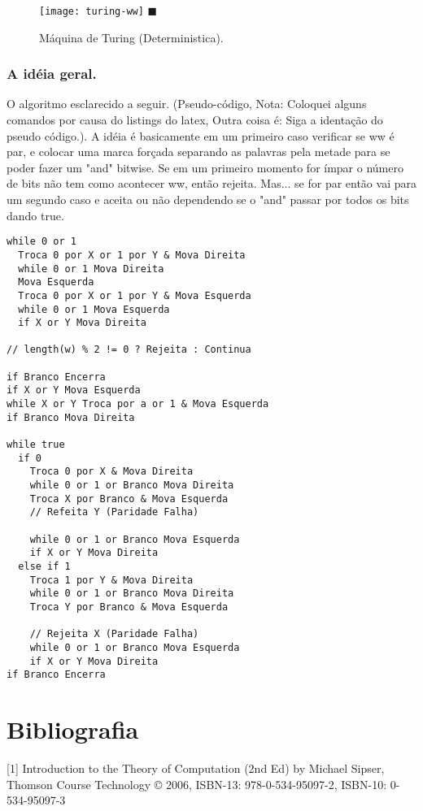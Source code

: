 \documentclass[12pt, a4paper]{article}
\begin{document}
\begin{figure}[ht]
\centering
\texttt{[image: turing-ww]} \flushright $\blacksquare$
\caption{Máquina de Turing (Deterministica).}
\end{figure}


\subsubsection{A idéia geral.}
\qquad O algoritmo esclarecido a seguir. (Pseudo-código, Nota: Coloquei alguns comandos por causa do listings do latex, Outra coisa é: Siga a identação do pseudo código.). A idéia é basicamente em um primeiro caso verificar se ww é par, e colocar uma marca forçada separando as palavras pela metade para se poder fazer um "and" bitwise. Se em um primeiro momento for ímpar o número de bits não tem como acontecer ww, então rejeita. Mas... se for par então vai para um segundo caso e aceita ou não dependendo se o "and" passar por todos os bits dando true.

\pagebreak
\begin{lstlisting}
while 0 or 1
  Troca 0 por X or 1 por Y & Mova Direita
  while 0 or 1 Mova Direita
  Mova Esquerda
  Troca 0 por X or 1 por Y & Mova Esquerda
  while 0 or 1 Mova Esquerda
  if X or Y Mova Direita

// length(w) % 2 != 0 ? Rejeita : Continua

if Branco Encerra
if X or Y Mova Esquerda
while X or Y Troca por a or 1 & Mova Esquerda
if Branco Mova Direita

while true
  if 0
    Troca 0 por X & Mova Direita
    while 0 or 1 or Branco Mova Direita
    Troca X por Branco & Mova Esquerda
    // Refeita Y (Paridade Falha)

    while 0 or 1 or Branco Mova Esquerda
    if X or Y Mova Direita
  else if 1
    Troca 1 por Y & Mova Direita
    while 0 or 1 or Branco Mova Direita
    Troca Y por Branco & Mova Esquerda

    // Rejeita X (Paridade Falha)
    while 0 or 1 or Branco Mova Esquerda
    if X or Y Mova Direita
if Branco Encerra
\end{lstlisting}


\pagebreak
\section{Bibliografia}

[1] Introduction to the Theory of Computation (2nd Ed) by Michael Sipser, Thomson Course Technology © 2006, ISBN-13: 978-0-534-95097-2, ISBN-10: 0-534-95097-3
\end{document}
